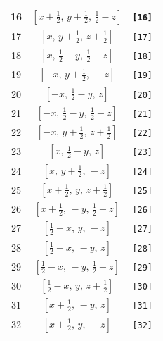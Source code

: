 \documentclass[fleqn,8pt]{jsarticle}
\begin{document}
\begin{longtable}{ccc}
16 & $\left[ x + \frac{1}{2},\, y + \frac{1}{2},\, \frac{1}{2} - z \right]$ & {\tt [16]} \\ \hline
17 & $\left[ x,\, y + \frac{1}{2},\, z + \frac{1}{2} \right]$ & {\tt [17]} \\ \hline
18 & $\left[ x,\, \frac{1}{2} - y,\, \frac{1}{2} - z \right]$ & {\tt [18]} \\ \hline
19 & $\left[ - x,\, y + \frac{1}{2},\, - z \right]$ & {\tt [19]} \\ \hline
20 & $\left[ - x,\, \frac{1}{2} - y,\, z \right]$ & {\tt [20]} \\ \hline
21 & $\left[ - x,\, \frac{1}{2} - y,\, \frac{1}{2} - z \right]$ & {\tt [21]} \\ \hline
22 & $\left[ - x,\, y + \frac{1}{2},\, z + \frac{1}{2} \right]$ & {\tt [22]} \\ \hline
23 & $\left[ x,\, \frac{1}{2} - y,\, z \right]$ & {\tt [23]} \\ \hline
24 & $\left[ x,\, y + \frac{1}{2},\, - z \right]$ & {\tt [24]} \\ \hline
25 & $\left[ x + \frac{1}{2},\, y,\, z + \frac{1}{2} \right]$ & {\tt [25]} \\ \hline
26 & $\left[ x + \frac{1}{2},\, - y,\, \frac{1}{2} - z \right]$ & {\tt [26]} \\ \hline
27 & $\left[ \frac{1}{2} - x,\, y,\, - z \right]$ & {\tt [27]} \\ \hline
28 & $\left[ \frac{1}{2} - x,\, - y,\, z \right]$ & {\tt [28]} \\ \hline
29 & $\left[ \frac{1}{2} - x,\, - y,\, \frac{1}{2} - z \right]$ & {\tt [29]} \\ \hline
30 & $\left[ \frac{1}{2} - x,\, y,\, z + \frac{1}{2} \right]$ & {\tt [30]} \\ \hline
31 & $\left[ x + \frac{1}{2},\, - y,\, z \right]$ & {\tt [31]} \\ \hline
32 & $\left[ x + \frac{1}{2},\, y,\, - z \right]$ & {\tt [32]} \\
\end{longtable}
\end{document}
